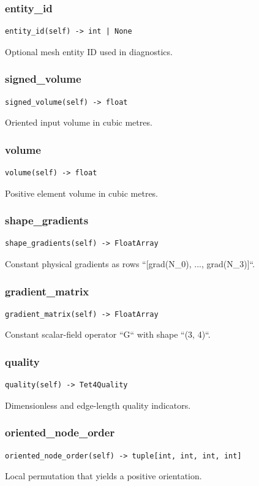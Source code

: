 \subsubsection*{entity\_id}
\begin{lstlisting}
entity_id(self) -> int | None
\end{lstlisting}
Optional mesh entity ID used in diagnostics.
\subsubsection*{signed\_volume}
\begin{lstlisting}
signed_volume(self) -> float
\end{lstlisting}
Oriented input volume in cubic metres.
\subsubsection*{volume}
\begin{lstlisting}
volume(self) -> float
\end{lstlisting}
Positive element volume in cubic metres.
\subsubsection*{shape\_gradients}
\begin{lstlisting}
shape_gradients(self) -> FloatArray
\end{lstlisting}
Constant physical gradients as rows ``[grad(N\_0), ..., grad(N\_3)]``.
\subsubsection*{gradient\_matrix}
\begin{lstlisting}
gradient_matrix(self) -> FloatArray
\end{lstlisting}
Constant scalar-field operator ``G`` with shape ``(3, 4)``.
\subsubsection*{quality}
\begin{lstlisting}
quality(self) -> Tet4Quality
\end{lstlisting}
Dimensionless and edge-length quality indicators.
\subsubsection*{oriented\_node\_order}
\begin{lstlisting}
oriented_node_order(self) -> tuple[int, int, int, int]
\end{lstlisting}
Local permutation that yields a positive orientation.
